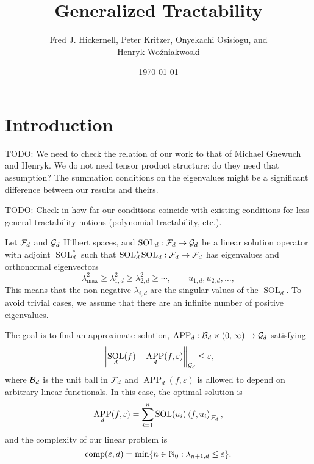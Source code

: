 \documentclass[11pt,a4paper]{article}
\DeclareMathOperator{\SOL}{SOL}
\DeclareMathOperator{\APP}{APP}
\newcommand{\fred}[1]{\begingroup\color{blue}#1\endgroup}
\newcommand{\peter}[1]{\begingroup\color{purple}#1\endgroup}
\newcommand{\kachi}[1]{\begingroup\color{ForestGreen}#1\endgroup}
\begin{document}
\newtheorem{theorem}{Theorem}
\theoremstyle{definition}
\newtheorem{definition}{Definition}


\title{Generalized Tractability}
\author{\fred{Fred J. Hickernell}, \peter{Peter Kritzer}, \kachi{Onyekachi Osisiogu}, and \\ Henryk Wo\'zniakwoski}
\date{\today}

\maketitle

\section{Introduction}

TODO: We need to check the relation of our work to that of Michael Gnewuch and Henryk. We do not need tensor product structure: do they need that assumption? The summation conditions on the eigenvalues might be a significant difference between our results and theirs.

\medskip

TODO: Check in how far our conditions coincide with existing conditions for less general tractability notions (polynomial tractability, etc.).

\medskip

Let $\mathcal{F}_d$ and $\mathcal{G}_d$ Hilbert spaces, and $\SOL_d : \cf_d \to \cg_d$ be a linear solution operator with adjoint $\SOL_d^*$ such that $\SOL_d^*\SOL_d : \cf_d \to \cf_d$ has eigenvalues and orthonormal eigenvectors
\[
\lambda_{\max}^2 \ge \lambda_{1,d}^2 \ge \lambda_{2,d}^2 \ge \cdots, \qquad u_{1,d}, u_{2,d}, \ldots,
\]
This means that the non-negative $\lambda_{i,d}$ are the singular values of the $\SOL_d$. To avoid trivial cases, we assume that there are an infinite number of positive eigenvalues.


The goal is to find an approximate solution, $\APP_d:\cb_d \times (0,\infty) \to \cg_d$ satisfying
\[
\norm[\cg_d]{\SOL_d(f) - \APP_d(f,\varepsilon)} \le \varepsilon,
\]
where $\mathcal{B}_d$ is the unit ball in $\mathcal{F}_d$ and $\APP_d(f,\varepsilon)$ is allowed to depend on arbitrary linear functionals.  In this case, the optimal solution is
\[
\APP_d(f,\varepsilon) = \sum_{i=1}^n \SOL(u_i) \ip[\cf_d]{f}{u_i},
\]
and the complexity of our linear problem is
\begin{equation}\label{eq:comp_def}
\operatorname{comp}(\varepsilon, d) = \min \{n \in \mathbb{N}_{0} : \lambda_{n+1, d} \le \varepsilon\}.
\end{equation}
\end{document}

